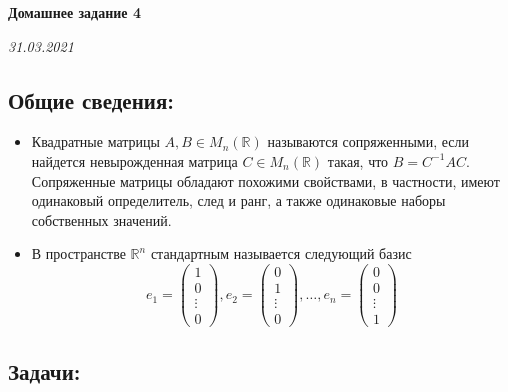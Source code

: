 \documentclass[a4paper]{article}
\theoremstyle{definition}
\theoremstyle{remark}
\theoremstyle{definition}
\begin{document}
\centerline{\bf{\Large Домашнее задание 4}}
\centerline{ {\it 31.03.2021}}
\vspace{10pt}


\subsection*{Общие сведения:}
\begin{itemize}

\item Квадратные матрицы $A, B\in M_{n}(\mathbb{R})$ называются сопряженными, если найдется невырожденная матрица $C\in M_{n}(\mathbb{R})$ такая, что $B = C^{-1}AC$. Сопряженные матрицы обладают похожими свойствами, в частности, имеют одинаковый определитель, след и ранг, а также одинаковые наборы собственных значений.

\item В пространстве $\mathbb R^n$ стандартным называется следующий базис
\[
e_1 = 
\begin{pmatrix}
{1}\\{0}\\{\vdots}\\{0}
\end{pmatrix},
e_2 = 
\begin{pmatrix}
{0}\\{1}\\{\vdots}\\{0}
\end{pmatrix},
\ldots,
e_n = 
\begin{pmatrix}
{0}\\{0}\\{\vdots}\\{1}
\end{pmatrix}
\]

\end{itemize}

\subsection*{Задачи:}
\end{document}
